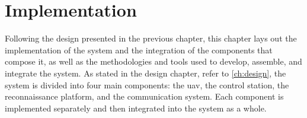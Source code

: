 \chapter{Implementation}\label{ch:implementation}

Following the design presented in the previous chapter, this chapter lays out the implementation of the system and the integration of the components that compose it, as well as the methodologies and tools used to develop, assemble, and integrate the system. As stated in the design chapter, refer to \cref{ch:design}, the system is divided into four main components: the \gls{uav}, the control station, the reconnaissance platform, and the communication system. Each component is implemented separately and then integrated into the system as a whole.






